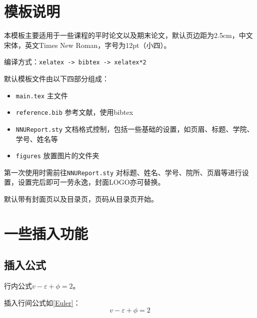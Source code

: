 \documentclass[12pt,hyperref,a4paper,UTF8]{ctexart}
\begin{document}
\cover

%
%

\thispagestyle{empty} %

\newpage
\tableofcontents

\newpage


\section{模板说明}
本模板主要适用于一些课程的平时论文以及期末论文，默认页边距为2.5cm，中文宋体，英文Times New Roman，字号为12pt（小四）。

编译方式：\verb|xelatex -> bibtex -> xelatex*2|


默认模板文件由以下四部分组成：
\begin{itemize}
    \item \texttt{main.tex} 主文件
    \item \texttt{reference.bib} 参考文献，使用bibtex
    \item \texttt{NNUReport.sty} 文档格式控制，包括一些基础的设置，如页眉、标题、学院、学号、姓名等
    \item \texttt{figures} 放置图片的文件夹
\end{itemize}

第一次使用时需前往\texttt{NNUReport.sty} 对标题、姓名、学号、院所、页眉等进行设置，设置完后即可一劳永逸，封面LOGO亦可替换。

默认带有封面页以及目录页，页码从目录页开始。

\section{一些插入功能}
\subsection{插入公式}
行内公式$v-\varepsilon+\phi=2$。

插入行间公式如\autoref{Euler}：
\begin{equation}
    v-\varepsilon+\phi=2
    \label{Euler}
\end{equation}
\end{document}
